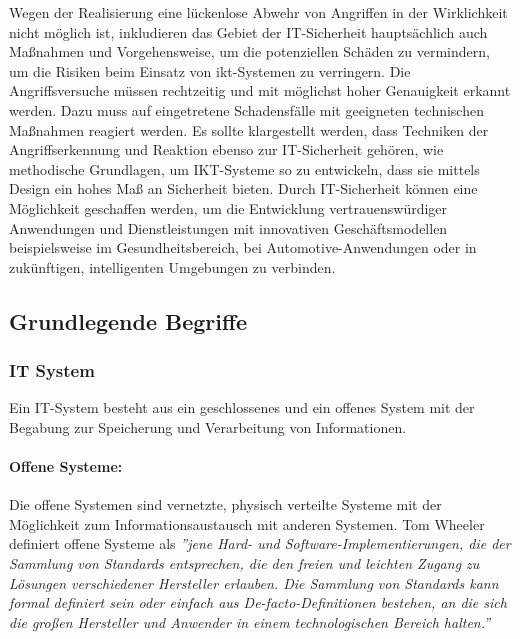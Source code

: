 Wegen der Realisierung eine lückenlose Abwehr von Angriffen in der Wirklichkeit nicht möglich ist, inkludieren das Gebiet der IT-Sicherheit hauptsächlich auch Maßnahmen und Vorgehensweise, um die potenziellen Schäden zu vermindern, um die Risiken beim Einsatz von \gls{ikt}-Systemen zu verringern. Die Angriffsversuche müssen rechtzeitig und mit möglichst hoher Genauigkeit erkannt werden. Dazu muss auf eingetretene Schadensfälle mit geeigneten technischen Maßnahmen reagiert werden. Es sollte klargestellt werden, dass Techniken der Angriffserkennung und Reaktion ebenso zur IT-Sicherheit gehören, wie methodische Grundlagen, um IKT-Systeme so zu entwickeln, dass sie mittels Design ein hohes Maß an Sicherheit bieten. Durch IT-Sicherheit können eine Möglichkeit geschaffen werden, um die Entwicklung vertrauenswürdiger Anwendungen und Dienstleistungen mit innovativen Geschäftsmodellen beispielsweise im Gesundheitsbereich, bei Automotive-Anwendungen oder in zukünftigen, intelligenten Umgebungen zu verbinden\cite[20--21]{eckert2013sicherheit}.

\subsection{Grundlegende Begriffe}

\subsubsection{IT System}

Ein IT-System besteht aus ein geschlossenes und ein offenes System mit der Begabung zur Speicherung und Verarbeitung von Informationen. 

\paragraph{Offene Systeme:}

Die offene Systemen sind vernetzte, physisch verteilte Systeme mit der Möglichkeit zum Informationsaustausch mit anderen Systemen\cite[22--23]{eckert2013sicherheit}. Tom Wheeler definiert offene Systeme als \emph{''jene Hard- und Software-Implementierungen, die der Sammlung von Standards entsprechen, die den freien und leichten Zugang zu Lösungen verschiedener Hersteller erlauben. Die Sammlung von Standards kann formal definiert sein oder einfach aus De-facto-Definitionen bestehen, an die sich die großen Hersteller und Anwender in einem technologischen Bereich halten.''}\cite[4]{wheeler2013offene}


